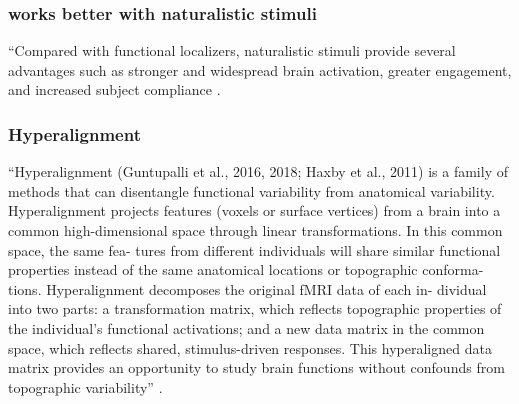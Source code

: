 \subsubsection{works better with naturalistic stimuli}

``Compared with functional localizers, naturalistic stimuli provide several
advantages such as stronger and widespread brain activation, greater engagement,
and increased subject compliance \citep{jiahui2020predicting}.

\subsubsection{Hyperalignment}


``Hyperalignment (Guntupalli et al., 2016, 2018; Haxby et al., 2011) is a family
of methods that can disentangle functional variability from anatomical
variability. Hyperalignment projects features (voxels or surface vertices) from
a brain into a common high-dimensional space through linear transformations. In
this common space, the same fea- tures from different individuals will share
similar functional properties instead of the same anatomical locations or
topographic conforma- tions. Hyperalignment decomposes the original fMRI data of
each in- dividual into two parts: a transformation matrix, which reﬂects
topographic properties of the individual's functional activations; and a new
data matrix in the common space, which reﬂects shared, stimulus-driven
responses. This hyperaligned data matrix provides an opportunity to study brain
functions without confounds from topographic variability''
\citep{feilong2018reliable}.

